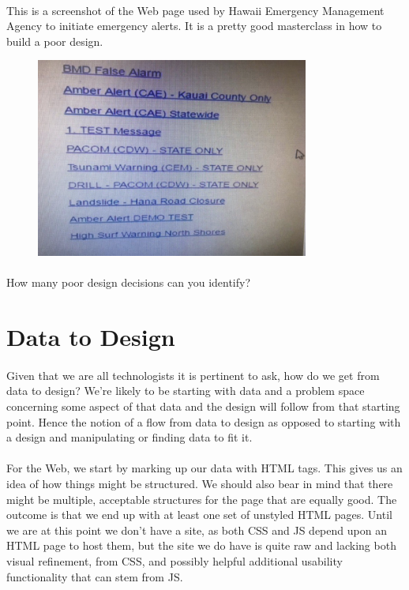 \paragraph{} This is a screenshot of the Web page used by Hawaii Emergency Management Agency to initiate emergency alerts. It is a pretty good masterclass in how to build a poor design.


\begin{figure}[H]
    \centering
    \includegraphics[width=0.8\textwidth]{figures/hawaii-ui}
    \label{fig:hawaii-ui}
    \caption{}
\end{figure}

\paragraph{} How many poor design decisions can you identify?

\section{Data to Design}
\paragraph{} Given that we are all technologists it is pertinent to ask, how do we get from data to design?  We're likely to be starting with data and a problem space concerning some aspect of that data and the design will follow from that starting point. Hence the notion of a flow from data to design as opposed to starting with a design and manipulating or finding data to fit it.
\paragraph{} For the Web, we start by marking up our data with HTML tags. This gives us an idea of how things might be structured. We should also bear in mind that there might be multiple, acceptable structures for the page that are equally good. The outcome is that we end up with at least one set of unstyled HTML pages. Until we are at this point we don't have a site, as both CSS and JS depend upon an HTML page to host them, but the site we do have is quite raw and lacking both visual refinement, from CSS, and possibly helpful additional usability functionality that can stem from JS.

